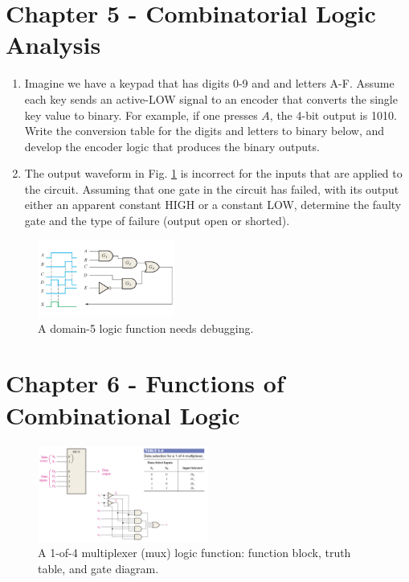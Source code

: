 \documentclass[10pt]{article}
\begin{document}
\maketitle

\section{Chapter 5 - Combinatorial Logic Analysis}
\label{sec:comb}

\begin{enumerate}
\item Imagine we have a keypad that has digits 0-9 and and letters A-F.  Assume each key sends an active-LOW signal to an encoder that converts the single key value to binary.  For example, if one presses $A$, the 4-bit output is 1010.  Write the conversion table for the digits and letters to binary below, and develop the encoder logic that produces the binary outputs. \\ \vspace{3cm}
\item The output waveform in Fig. \ref{fig:gates1} is incorrect for the inputs that are applied to the circuit.  Assuming that one gate in the circuit has failed, with its output either an apparent constant HIGH or a constant LOW, determine the faulty gate and the type of failure (output open or shorted).
\end{enumerate}

\begin{figure}[hb]
\centering
\includegraphics[width=0.4\textwidth]{figures/troubleshoot.pdf}
\caption{\label{fig:gates1} A domain-5 logic function needs debugging.}
\end{figure}

\section{Chapter 6 - Functions of Combinational Logic}
\label{sec:comb2}

\begin{figure}[ht]
\centering
\includegraphics[width=0.5\textwidth]{figures/mux4.pdf}
\caption{\label{fig:mux4} A 1-of-4 multiplexer (mux) logic function: function block, truth table, and gate diagram.}
\end{figure}
\end{document}
